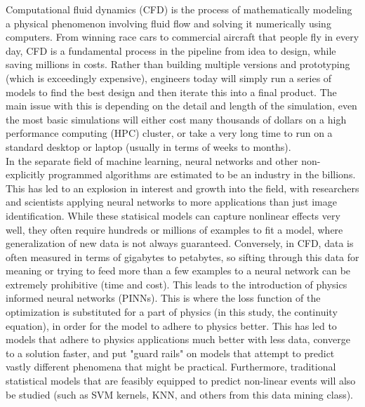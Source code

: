 \documentclass{article}
\begin{document}
	\indent Computational fluid dynamics (CFD) is the process of mathematically modeling a physical phenomenon involving fluid flow and solving it numerically using computers. From winning race cars to commercial aircraft that people fly in every day, CFD is a fundamental process in the pipeline from idea to design, while saving millions in costs. Rather than building multiple versions and prototyping (which is exceedingly expensive), engineers today will simply run a series of models to find the best design and then iterate this into a final product. The main issue with this is depending on the detail and length of the simulation, even the most basic simulations will either cost many thousands of dollars on a high performance computing (HPC) cluster, or take a very long time to run on a standard desktop or laptop (usually in terms of weeks to months). \\
%	
%	
	In the separate field of machine learning, neural networks and other non-explicitly programmed algorithms are estimated to be an industry in the billions. This has led to an explosion in interest and growth into the field, with researchers and scientists applying neural networks to more applications than just image identification. While these statisical models can capture nonlinear effects very well, they often require hundreds or millions of examples to fit a model, where generalization of new data is not always guaranteed. Conversely, in CFD, data is often measured in terms of gigabytes to petabytes, so sifting through this data for meaning or trying to feed more than a few examples to a neural network can be extremely prohibitive (time and cost). This leads to the introduction of physics informed neural networks (PINNs). This is where the loss function of the optimization is substituted for a part of physics (in this study, the continuity equation), in order for the model to adhere to physics better. This has led to models that adhere to physics applications much better with less data, converge to a solution faster, and put "guard rails" on models that attempt to predict vastly different phenomena that might be practical. Furthermore, traditional statistical models that are feasibly equipped to predict non-linear events will also be studied (such as SVM kernels, KNN, and others from this data mining class).
	
\end{document}
